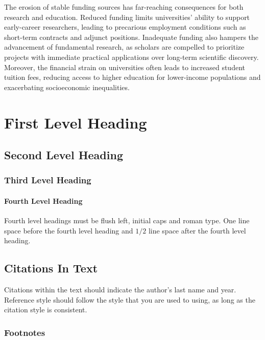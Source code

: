\documentclass[letterpaper, twocolumn]{article}
\begin{document}
	The erosion of stable funding sources has far-reaching consequences for both research and education. Reduced funding limits universities' ability to support early-career researchers, leading to precarious employment conditions such as short-term contracts and adjunct positions. Inadequate funding also hampers the advancement of fundamental research, as scholars are compelled to prioritize projects with immediate practical applications over long-term scientific discovery. Moreover, the financial strain on universities often leads to increased student tuition fees, reducing access to higher education for lower-income populations and exacerbating socioeconomic inequalities.
	
	\section{First Level Heading}
	\lipsum[9]
	
	\subsection{Second Level Heading}
	\lipsum[10]
	
	\subsubsection{Third Level Heading}
	\lipsum[11]
	
	\paragraph{Fourth Level Heading}
	
	Fourth level headings must be flush left, initial caps and roman type.
	One line space before the fourth level heading and $1/2$ line
	space after the fourth level heading.
	
	\subsection{Citations In Text}
	
	Citations within the text should indicate the author's last name and
	year\cite{Knuth-vol3}. Reference style\cite{Comer-btree}
	should follow the style that you are used to using, as long as the
	citation style is consistent.
	
	\subsubsection{Footnotes}
	
\end{document}
